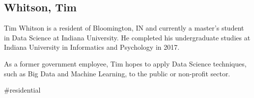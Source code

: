 \subsection{Whitson, Tim}
Tim Whitson is a resident of Bloomington, IN and currently a master's student in 
Data Science at Indiana University. He completed his undergraduate studies 
at Indiana University in Informatics and Psychology in 2017.

As a former government employee, Tim hopes to apply Data Science techniques, such 
as Big Data and Machine Learning, to the public or non-profit sector.

#residential
